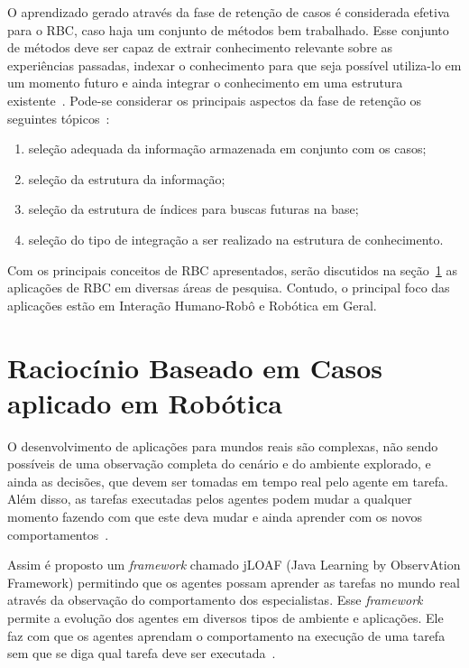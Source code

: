 O aprendizado gerado através da fase de retenção de casos  é considerada efetiva para o RBC, caso haja um conjunto de métodos bem trabalhado. Esse conjunto de métodos deve ser capaz de extrair conhecimento relevante sobre as experiências passadas, indexar o conhecimento para que seja possível utiliza-lo em um momento futuro e ainda integrar o conhecimento em uma estrutura existente~\cite{Gresse:2003}. Pode-se considerar os principais aspectos da fase de retenção os seguintes tópicos~\cite{Gresse:2003}:

\begin{enumerate}
	\item seleção adequada da informação armazenada em conjunto com os casos;
	\item seleção da estrutura da informação;
	\item seleção da estrutura de índices para buscas futuras na base;
	\item seleção do tipo de integração a ser realizado na estrutura de conhecimento.
\end{enumerate}

Com os principais conceitos de RBC apresentados, serão discutidos na seção~\ref{sec:rbcaplicado} as aplicações de RBC em diversas áreas de pesquisa. Contudo, o principal foco das aplicações estão em Interação Humano-Robô e Robótica em Geral.

\section{Raciocínio Baseado em Casos aplicado em Robótica}
\label{sec:rbcaplicado}

O desenvolvimento de aplicações para mundos reais são complexas, não sendo possíveis de uma observação completa do cenário e do ambiente explorado, e ainda as decisões, que devem ser tomadas em tempo real pelo agente em tarefa. Além disso, as tarefas executadas pelos agentes podem mudar a qualquer momento fazendo com que este deva mudar e ainda aprender com os novos comportamentos~\cite{Floyd:2011}.

Assim é proposto um \emph{framework} chamado jLOAF (Java Learning by ObservAtion Framework) permitindo que os agentes possam aprender as tarefas no mundo real através da observação do comportamento dos especialistas. Esse \emph{framework} permite a evolução dos agentes em diversos tipos de ambiente e aplicações. Ele faz com que os agentes aprendam o comportamento na execução de uma tarefa sem que se diga qual tarefa deve ser executada~\cite{Floyd:2011}.


